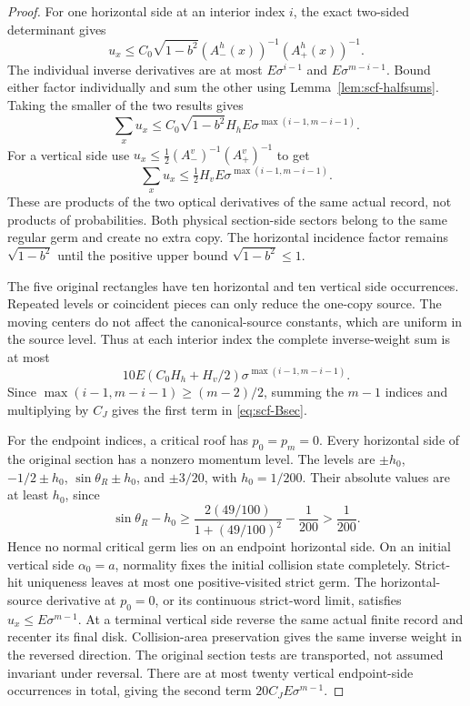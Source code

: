 \begin{proof}
For one horizontal side at an interior index $i$, the exact
two-sided determinant gives
\[
 u_x\le C_0\sqrt{1-b^2}(A_-^h(x))^{-1}(A_+^h(x))^{-1}.
\]
The individual inverse derivatives are at most $E\sigma^{i-1}$
and $E\sigma^{m-i-1}$. Bound either factor individually and sum
the other using Lemma~\ref{lem:scf-halfsums}. Taking the smaller
of the two results gives
\begin{equation}\label{eq:scf-h-weight}
 \sum_xu_x\le C_0\sqrt{1-b^2}H_hE
                      \sigma^{\max(i-1,m-i-1)}.
\end{equation}
For a vertical side use
$u_x\le\tfrac12(A_-^v)^{-1}(A_+^v)^{-1}$ to get
\begin{equation}\label{eq:scf-v-weight}
 \sum_xu_x\le\tfrac12H_vE\sigma^{\max(i-1,m-i-1)}.
\end{equation}
These are products of the two optical derivatives of the same
actual record, not products of probabilities. Both physical
section-side sectors belong to the same regular germ and create
no extra copy. The horizontal incidence factor remains
$\sqrt{1-b^2}$ until the positive
upper bound $\sqrt{1-b^2}\le1$.

The five original rectangles have ten horizontal and ten vertical
side occurrences. Repeated levels or coincident pieces can only
reduce the one-copy source. The moving centers do not affect the
canonical-source constants, which are uniform in the source level.
Thus at each interior index the complete inverse-weight sum is at
most
\[
 10E(C_0H_h+H_v/2)\sigma^{\max(i-1,m-i-1)}.
\]
Since $\max(i-1,m-i-1)\ge(m-2)/2$, summing the $m-1$ indices
and multiplying by $C_J$ gives the first term in
\eqref{eq:scf-Bsec}.

For the endpoint indices, a critical roof has $p_0=p_m=0$.
Every horizontal side of the original section has a nonzero
momentum level. The levels are $\pm h_0$, $-1/2\pm h_0$,
$\sin\theta_R\pm h_0$, and $\pm3/20$, with $h_0=1/200$.
Their absolute values are at least $h_0$, since
\[
 \sin\theta_R-h_0\ge
 \frac{2(49/100)}{1+(49/100)^2}-\frac1{200}>\frac1{200}.
\]
Hence no normal critical germ lies on an endpoint horizontal side.
On an initial vertical side $\alpha_0=a$, normality fixes the
initial collision state completely. Strict-hit uniqueness leaves
at most one positive-visited strict germ. The horizontal-source
derivative at $p_0=0$, or its continuous strict-word limit,
satisfies $u_x\le E\sigma^{m-1}$.
At a terminal vertical side reverse the same actual finite record
and recenter its final disk. Collision-area preservation gives the
same inverse weight in the reversed direction. The original section
tests are transported, not assumed invariant under reversal.
There are at most twenty vertical endpoint-side occurrences in
total, giving the second term $20C_JE\sigma^{m-1}$.


\end{proof}
